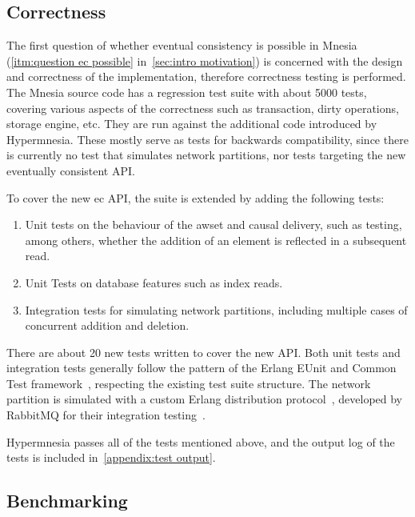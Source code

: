 \subsection{Correctness} \label{sec:eval correctness}

The first question of whether eventual consistency is possible in 
Mnesia (\cref{itm:question ec possible} in~\cref{sec:intro motivation}) is
concerned with the design and correctness of the implementation, therefore
correctness testing is performed.
The Mnesia source code has a regression test suite with about 5000 tests, 
covering various aspects of the correctness such as transaction, 
dirty operations, storage engine, etc. They are
run against the additional code introduced by Hypermnesia. These
mostly serve as tests for backwards compatibility, since there is currently no 
test that simulates network partitions, nor tests targeting the new eventually 
consistent API\@.

To cover the new \acrshort{ec} API, the suite is extended by
adding the following tests:

\begin{enumerate}
  \item Unit tests on the behaviour of the \acrshort{awset}
  and causal delivery, such as testing, among others, whether the addition of an 
  element is reflected in a subsequent read.
  \item Unit Tests on database features such as index reads.
  \item Integration tests for simulating network partitions, including multiple 
  cases of concurrent addition and deletion.
\end{enumerate}

There are about 20 new tests written to cover the new API. 
Both unit tests and integration tests generally follow the pattern of the Erlang
EUnit and Common Test framework~\cite{ericssonab2023eunit,ericssonab2023ct},
respecting the existing test suite structure. The network partition is simulated with
a custom Erlang distribution protocol~\cite{ericssonab2023erldistro}, 
developed by RabbitMQ for their integration testing~\cite{rabbitmq2022inet_tcp_proxy}.

Hypermnesia passes all of the tests mentioned above, and the output
log of the tests is included in~\cref{appendix:test output}.

\subsection{Benchmarking} \label{sec:eval benchmarks}


